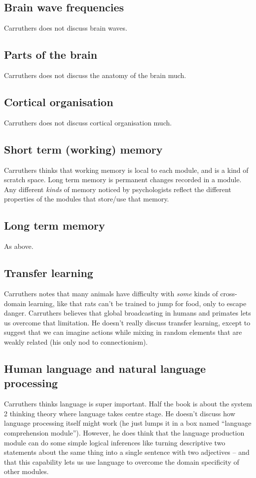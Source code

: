\documentclass[10pt,a4paper]{article}
\newcommand{\nquote}[1]{``{#1}''}
\begin{document}
\subsection{Brain wave frequencies}
Carruthers does not discuss brain waves.

\subsection{Parts of the brain}
Carruthers does not discuss the anatomy of the brain much.

\subsection{Cortical organisation}
Carruthers does not discuss cortical organisation much.

\subsection{Short term (working) memory}
Carruthers thinks that working memory is local to each module, and is a kind of scratch space. Long term memory is permanent changes recorded in a module. Any different \emph{kinds} of memory noticed by psychologists reflect the different properties of the modules that store/use that memory.

\subsection{Long term memory}
As above.

\subsection{Transfer learning}
Carruthers notes that many animals have difficulty with \emph{some} kinds of cross-domain learning, like that rats can't be trained to jump for food, only to escape danger. Carruthers believes that global broadcasting in humans and primates lets us overcome that limitation. He doesn't really discuss transfer learning, except to suggest that we can imagine actions while mixing in random elements that are weakly related (his only nod to connectionism).

\subsection{Human language and natural language processing}
Carruthers thinks language is super important. Half the book is about the system 2 thinking theory where language takes centre stage. He doesn't discuss how language processing itself might work (he just lumps it in a box named \nquote{language comprehension module}). However, he does think that the language production module can do some simple logical inferences like turning descriptive two statements about the same thing into a single sentence with two adjectives -- and that this capability lets us use language to overcome the domain specificity of other modules.
\end{document}
